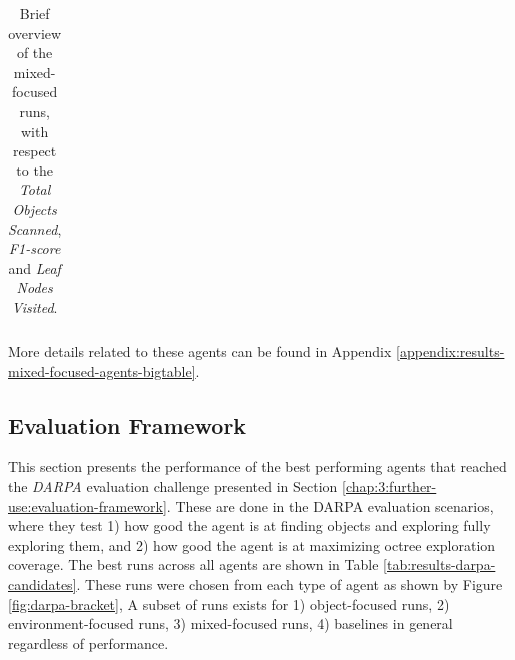 \begin{longtable}{|l|c|c|c|c|}
    \caption{Brief overview of the mixed-focused runs, with respect to the \textit{Total Objects Scanned}, \textit{F1-score} and \textit{Leaf Nodes Visited}.}
    \label{tab:results-mixed-agents}
\end{longtable}

More details related to these agents can be found in Appendix \ref{appendix:results-mixed-focused-agents-bigtable}.



\subsection{Evaluation Framework}
This section presents the performance of the best performing agents that reached the \textit{DARPA} evaluation challenge presented in Section \ref{chap:3:further-use:evaluation-framework}. 
These are done in the DARPA evaluation scenarios, where they test 1) how good the agent is at finding objects and exploring fully exploring them, and 2) how good the agent is at maximizing octree exploration coverage. 
The best runs across all agents are shown in Table \ref{tab:results-darpa-candidates}. 
These runs were chosen from each type of agent as shown by Figure \ref{fig:darpa-bracket}, A subset of runs exists for 1) object-focused runs, 2) environment-focused runs, 3) mixed-focused runs, 4) baselines in general regardless of performance.%

